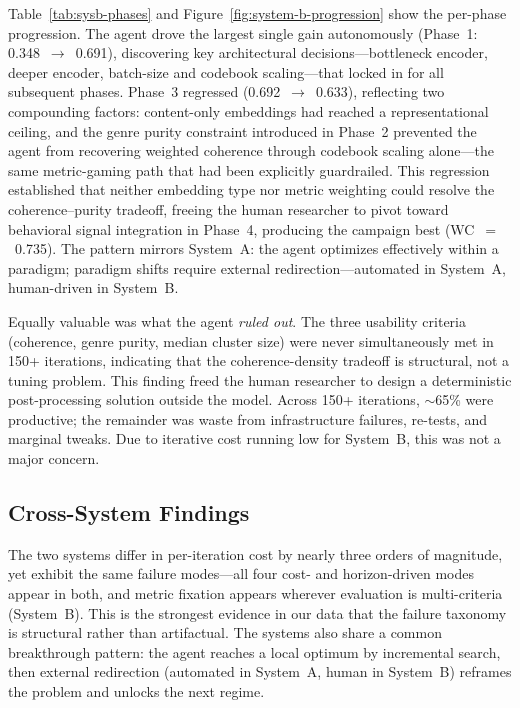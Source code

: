 \documentclass[conference]{IEEEtran}
\begin{document}
Table~\ref{tab:sysb-phases} and Figure~\ref{fig:system-b-progression} show the per-phase progression. The agent
drove the largest single gain autonomously (Phase~1: 0.348~$\to$~0.691), 
discovering key architectural decisions---bottleneck encoder, deeper 
encoder, batch-size and codebook scaling---that locked in for all 
subsequent phases. Phase~3 regressed (0.692~$\to$~0.633), reflecting 
two compounding factors: content-only embeddings had reached a 
representational ceiling, and the genre purity constraint introduced 
in Phase~2 prevented the agent from recovering weighted coherence 
through codebook scaling alone---the same metric-gaming path that had 
been explicitly guardrailed. This regression established that neither 
embedding type nor metric weighting could resolve the 
coherence--purity tradeoff, freeing the human researcher to pivot 
toward behavioral signal integration in Phase~4, producing the 
campaign best (WC~$=$~0.735). The pattern mirrors System~A: the agent 
optimizes effectively within a paradigm; paradigm shifts require 
external redirection---automated in System~A, human-driven in 
System~B.



Equally valuable was what the agent \textit{ruled out}. The three usability criteria (coherence, genre purity, median cluster size) were never simultaneously met in 150+ iterations, indicating that the coherence-density tradeoff is structural, not a tuning problem. This finding freed the human researcher to design a deterministic post-processing solution outside the model. Across 150+ iterations, ${\sim}$65\% were productive; the remainder was waste from infrastructure failures, re-tests, and marginal tweaks. Due to iterative cost running low for System~B, this was not a major concern.

\subsection{Cross-System Findings}

The two systems differ in per-iteration cost by nearly three orders of magnitude, yet exhibit the same failure modes---all four cost- and horizon-driven modes appear in both, and metric fixation appears wherever evaluation is multi-criteria (System~B). This is the strongest evidence in our data that the failure taxonomy is structural rather than artifactual. The systems also share a common breakthrough pattern: the agent reaches a local optimum by incremental search, then external redirection (automated in System~A, human in System~B) reframes the problem and unlocks the next regime.
\end{document}
